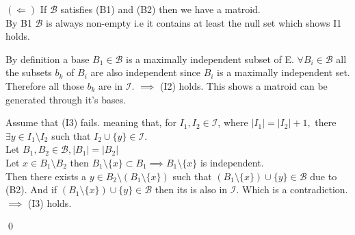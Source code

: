 \documentclass{article}
\theoremstyle{plain}
\theoremstyle{definition}
\theoremstyle{remark}
\begin{document}
\vspace{4mm}

\noindent $( \Longleftarrow )$ If $\mathcal{B}$ satisfies (B1) and (B2) then we have a matroid.\\
\noindent By B1 $\mathcal{B}$ is always non-empty i.e it contains at least the null set which shows I1 holds.

\vspace{2mm}

\noindent By definition a base $B_1 \in \mathcal{B}$ is a maximally independent subset of E. $\forall B_i \in \mathcal{B}$ all the subsets $b_k$ of $B_i$  are also independent since $B_i$ is a maximally independent set. Therefore all those $b_k$ are in $\mathcal{I}$. $\implies$ (I2) holds. This shows a matroid can be generated through it's bases.

\vspace{2mm}

\noindent Assume that (I3) fails. meaning that, for $I_1, I_2 \in \mathcal{I}$, where $|I_1| = |I_2|+1,$ there $\exists y \in I_1 \setminus I_2$ such that $I_2 \cup \{y\} \in \mathcal{I}$.\\
\noindent Let $B_1, B_2 \in \mathcal{B}, |B_1| = |B_2|$\\
\noindent Let $x \in B_1 \setminus B_2$ then $B_1 \setminus \{x\} \subset B_1 \implies B_1 \setminus \{x\}$ is independent.\\
\noindent Then there exists a $y \in B_2 \setminus (B_1 \setminus \{x\})$ such that $(B_1 \setminus \{x\}) \cup \{y\} \in \mathcal{B}$ due to (B2). And if $(B_1 \setminus \{x\}) \cup \{y\} \in \mathcal{B}$ then its is also in $\mathcal{I}$. Which is a contradiction. $\implies$ (I3) holds.

\qed
\end{document}
